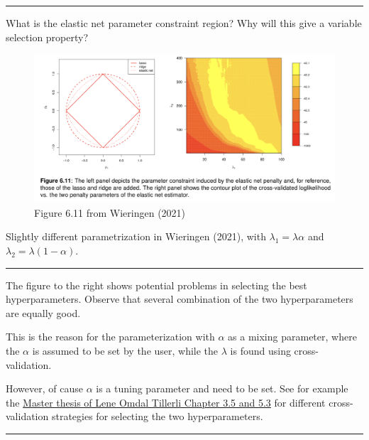 \documentclass[
  letterpaper,
  DIV=11,
  numbers=noendperiod]{scrartcl}
\begin{document}
\begin{center}\rule{0.5\linewidth}{0.5pt}\end{center}

What is the elastic net parameter constraint region? Why will this give
a variable selection property?

\begin{figure}

{\centering \includegraphics[width=1\textwidth,height=\textheight]{./WNvWFig611.jpg}

}

\caption{Figure 6.11 from Wieringen (2021)}

\end{figure}

Slightly different parametrization in Wieringen (2021), with
\(\lambda_1=\lambda\alpha\) and \(\lambda_2=\lambda(1-\alpha)\).

\begin{center}\rule{0.5\linewidth}{0.5pt}\end{center}

The figure to the right shows potential problems in selecting the best
hyperparameters. Observe that several combination of the two
hyperparameters are equally good.

This is the reason for the parameterization with \(\alpha\) as a mixing
parameter, where the \(\alpha\) is assumed to be set by the user, while
the \(\lambda\) is found using cross-validation.

However, of cause \(\alpha\) is a tuning parameter and need to be set.
See for example the
\href{https://ntnuopen.ntnu.no/ntnu-xmlui/handle/11250/3026839}{Master
thesis of Lene Omdal Tillerli Chapter 3.5 and 5.3} for different
cross-validation strategies for selecting the two hyperparameters.

\begin{center}\rule{0.5\linewidth}{0.5pt}\end{center}
\end{document}

